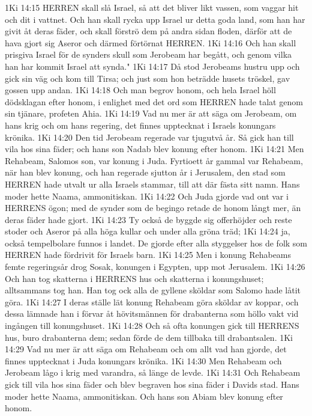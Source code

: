 1Ki 14:15  HERREN skall slå Israel, så att det bliver likt vassen, som vaggar hit och dit i vattnet. Och han skall rycka upp Israel ur detta goda land, som han har givit åt deras fäder, och skall förströ dem på andra sidan floden, därför att de hava gjort sig Aseror och därmed förtörnat HERREN.
1Ki 14:16  Och han skall prisgiva Israel för de synders skull som Jerobeam har begått, och genom vilka han har kommit Israel att synda."
1Ki 14:17  Då stod Jerobeams hustru upp och gick sin väg och kom till Tirsa; och just som hon beträdde husets tröskel, gav gossen upp andan.
1Ki 14:18  Och man begrov honom, och hela Israel höll dödsklagan efter honom, i enlighet med det ord som HERREN hade talat genom sin tjänare, profeten Ahia.
1Ki 14:19  Vad nu mer är att säga om Jerobeam, om hans krig och om hans regering, det finnes upptecknat i Israels konungars krönika.
1Ki 14:20  Den tid Jerobeam regerade var tjugutvå år. Så gick han till vila hos sina fäder; och hans son Nadab blev konung efter honom.
1Ki 14:21  Men Rehabeam, Salomos son, var konung i Juda. Fyrtioett år gammal var Rehabeam, när han blev konung, och han regerade sjutton år i Jerusalem, den stad som HERREN hade utvalt ur alla Israels stammar, till att där fästa sitt namn. Hans moder hette Naama, ammonitiskan.
1Ki 14:22  Och Juda gjorde vad ont var i HERRENS ögon; med de synder som de begingo retade de honom långt mer, än deras fäder hade gjort.
1Ki 14:23  Ty också de byggde sig offerhöjder och reste stoder och Aseror på alla höga kullar och under alla gröna träd;
1Ki 14:24  ja, också tempelbolare funnos i landet. De gjorde efter alla styggelser hos de folk som HERREN hade fördrivit för Israels barn.
1Ki 14:25  Men i konung Rehabeams femte regeringsår drog Sosak, konungen i Egypten, upp mot Jerusalem.
1Ki 14:26  Och han tog skatterna i HERRENS hus och skatterna i konungshuset; alltsammans tog han. Han tog ock alla de gyllene sköldar som Salomo hade låtit göra.
1Ki 14:27  I deras ställe lät konung Rehabeam göra sköldar av koppar, och dessa lämnade han i förvar åt hövitsmännen för drabanterna som höllo vakt vid ingången till konungshuset.
1Ki 14:28  Och så ofta konungen gick till HERRENS hus, buro drabanterna dem; sedan förde de dem tillbaka till drabantsalen.
1Ki 14:29  Vad nu mer är att säga om Rehabeam och om allt vad han gjorde, det finnes upptecknat i Juda konungars krönika.
1Ki 14:30  Men Rehabeam och Jerobeam lågo i krig med varandra, så länge de levde.
1Ki 14:31  Och Rehabeam gick till vila hos sina fäder och blev begraven hos sina fäder i Davids stad. Hans moder hette Naama, ammonitiskan. Och hans son Abiam blev konung efter honom.
